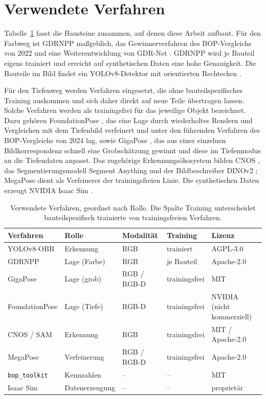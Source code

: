 \documentclass[oneside,studentpaper]{wbk}
\begin{document}
\section{Verwendete Verfahren}

Tabelle~\ref{tab:methoden} fasst die Bausteine zusammen, auf denen diese Arbeit
aufbaut. Für den Farbweg ist GDRNPP \cite{gdrnpp2025} maßgeblich, das
Gewinnerverfahren des BOP-Vergleichs von 2022 und eine Weiterentwicklung von
GDR-Net \cite{gdrnet2021}. GDRNPP wird je Bauteil eigens trainiert und erreicht
auf synthetischen Daten eine hohe Genauigkeit. Die Bauteile im Bild findet ein
YOLOv8-Detektor mit orientierten Rechtecken \cite{yolov8}.

Für den Tiefenweg werden Verfahren eingesetzt, die ohne bauteilspezifisches
Training auskommen und sich daher direkt auf neue Teile übertragen lassen. Solche
Verfahren werden als trainingsfrei für das jeweilige Objekt bezeichnet. Dazu
gehören FoundationPose \cite{foundationpose2024}, das eine Lage durch
wiederholtes Rendern und Vergleichen mit dem Tiefenbild verfeinert und unter den
führenden Verfahren des BOP-Vergleichs von 2024 lag, sowie GigaPose
\cite{gigapose2024}, das aus einer einzelnen Bildkorrespondenz schnell eine
Grobschätzung gewinnt und diese im Tiefenmodus an die Tiefendaten anpasst. Das
zugehörige Erkennungsökosystem bilden CNOS \cite{cnos2023}, das
Segmentierungsmodell Segment Anything \cite{sam2023} und der Bildbeschreiber
DINOv2 \cite{dinov2_2023}; MegaPose \cite{megapose2022} dient als Verfeinerer der
trainingsfreien Linie. Die synthetischen Daten erzeugt NVIDIA Isaac Sim
\cite{isaacsim}.

\begin{table}[H]
\caption{Verwendete Verfahren, geordnet nach Rolle. Die Spalte Training
unterscheidet bauteilspezifisch trainierte von trainingsfreien Verfahren.}
\label{tab:methoden}
\centering
\small
\begin{tabularx}{\textwidth}{l l l l X}
\toprule
\textbf{Verfahren} & \textbf{Rolle} & \textbf{Modalität} & \textbf{Training} & \textbf{Lizenz} \\
\midrule
YOLOv8-OBB      & Erkennung        & RGB    & trainiert       & AGPL-3.0 \\
GDRNPP          & Lage (Farbe)     & RGB    & je Bauteil      & Apache-2.0 \\
GigaPose        & Lage (grob)      & RGB / RGB-D & trainingsfrei & MIT \\
FoundationPose  & Lage (Tiefe)     & RGB-D  & trainingsfrei   & NVIDIA (nicht kommerziell) \\
CNOS / SAM      & Erkennung        & RGB    & trainingsfrei   & MIT / Apache-2.0 \\
MegaPose        & Verfeinerung     & RGB / RGB-D & trainingsfrei & Apache-2.0 \\
\texttt{bop\_toolkit} & Kennzahlen & --     & --              & MIT \\
Isaac Sim       & Datenerzeugung   & --     & --              & proprietär \\
\bottomrule
\end{tabularx}
\end{table}
\end{document}
